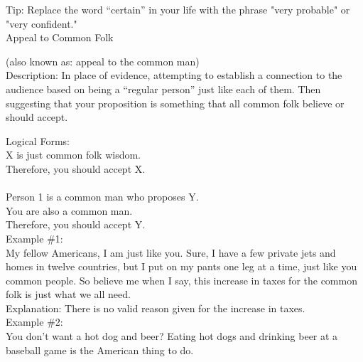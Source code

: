 \documentclass[a4paper,12pt,single,pdftex]{scrartcl}
\begin{document}
    
      Tip: Replace the word “certain” in your life with the phrase "very probable" or "very confident."
    \\

  

Appeal to Common Folk
    
      (also known as: appeal to the common man)
    \\

  
    Description: In place of evidence, attempting to establish a connection to the audience based on being a “regular person” just like each of them.  Then suggesting that your proposition is something that all common folk believe or should accept.

    
      Logical Forms:
    \\

    
      X is just common folk wisdom.
    \\

    
      Therefore, you should accept X.
    \\

    
       
    \\

    
      Person 1 is a common man who proposes Y.
    \\

    
      You are also a common man.
    \\

    
      Therefore, you should accept Y.
    \\

    
      Example \#1:
    \\

    
      My fellow Americans, I am just like you.  Sure, I have a few private jets and homes in twelve countries, but I put on my pants one leg at a time, just like you common people.  So believe me when I say, this increase in taxes for the common folk is just what we all need.
    \\

    
      Explanation: There is no valid reason given for the increase in taxes.
    \\

    
      Example \#2:
    \\

    
      You don't want a hot dog and beer?  Eating hot dogs and drinking beer at a baseball game is the American thing to do.
    \\
\end{document}
